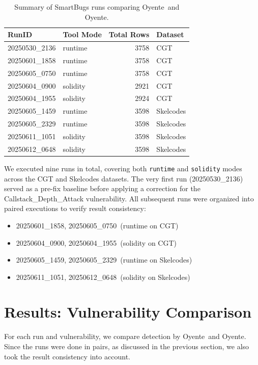 \documentclass{article}
\newcommand\OY{Oyente}
\newcommand\OYp{\OY\raisebox{0.3ex}{\smaller +}}
\newcommand\CGTrbcA{20250530\_2136}%
\newcommand\CGTrbcB{20250601\_1858}%
\newcommand\CGTrbcC{20250605\_0750}%
\newcommand\CGTsscA{20250604\_0900}%
\newcommand\CGTsscB{20250604\_1955}%
\newcommand\SKCrbcA{20250605\_1459}%
\newcommand\SKCrbcB{20250605\_2329}%
\newcommand\SKCsscA{20250611\_1051}%
\newcommand\SKCsscB{20250612\_0648}%
\begin{document}
	\begin{table}[ht]
		\centering
		\begin{tabular}{llr l}
			\toprule
			\textbf{RunID} & \textbf{Tool Mode} & \textbf{Total Rows} & \textbf{Dataset} \\
			\midrule
			\CGTrbcA & runtime & 3758 & CGT \\
			\CGTrbcB & runtime & 3758 & CGT \\
			\CGTrbcC & runtime & 3758 & CGT \\
			\CGTsscA & solidity & 2921 & CGT \\
			\CGTsscB & solidity & 2924 & CGT \\
			\SKCrbcA & runtime & 3598 & Skelcodes \\
			\SKCrbcB & runtime & 3598 & Skelcodes \\
			\SKCsscA & solidity & 3598 & Skelcodes \\
			\SKCsscB & solidity & 3598 & Skelcodes \\
			\bottomrule
		\end{tabular}
		\caption{Summary of SmartBugs runs comparing \OY\ and \OYp.}
		\label{tab:run-summary}
	\end{table}

	We executed nine runs in total, covering both \texttt{runtime} and \texttt{solidity} modes across the CGT and Skelcodes datasets. The very first run (\CGTrbcA) served as a pre-fix baseline before applying a correction for the Callstack\_Depth\_Attack vulnerability. All subsequent runs were organized into paired executions to verify result consistency:

	\begin{itemize}
		\item \CGTrbcB, \CGTrbcC\ (runtime on CGT)
		\item \CGTsscA, \CGTsscB\ (solidity on CGT)
		\item \SKCrbcA, \SKCrbcB\ (runtime on Skelcodes)
		\item \SKCsscA, \SKCsscB\ (solidity on Skelcodes)
	\end{itemize}

	\section{Results: Vulnerability Comparison}
	For each run and vulnerability, we compare detection by \OY\ and \OYp. Since the runs were done in pairs, as discussed in the previous section, we also took the result consistency into account.
\end{document}
